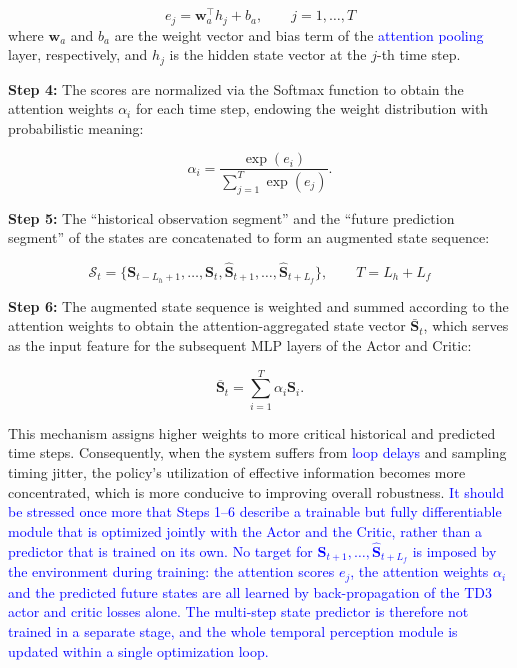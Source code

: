 \documentclass[review]{elsarticle}
\begin{document}
\begin{equation}\label{eq:attention_score}
{e}_{j}=\mathbf{w}_{a}^{\top }{h}_{j}+{b}_{a},\qquad j=1,\ldots ,T
\end{equation}
where $\mathbf{w}_a$ and $b_a$ are the weight vector and bias term of the \textcolor{blue}{attention pooling} layer, respectively, and $h_j$ is the hidden state vector at the $j$-th time step.

\textbf{Step 4:} The scores are normalized via the Softmax function to obtain the attention weights $\alpha_i$ for each time step, endowing the weight distribution with probabilistic meaning:

\begin{equation}\label{eq:softmax_attention}
\alpha_i = \frac{\exp(e_i)}{\sum_{j=1}^{T} \exp(e_j)}.
\end{equation}

\textbf{Step 5:} The ``historical observation segment'' and the ``future prediction segment'' of the states are concatenated to form an augmented state sequence:

\begin{equation}\label{eq:augmented_state_seq}
{\mathcal{S}}_{t}=\{{\mathbf{S}}_{t-{L}_{h}+1},\ldots ,{\mathbf{S}}_{t},{\hat{\mathbf{S}}}_{t+1},\ldots ,{\hat{\mathbf{S}}}_{t+{L}_{f}}\},\qquad T={L}_{h}+{L}_{f}
\end{equation}

\textbf{Step 6:} The augmented state sequence is weighted and summed according to the attention weights to obtain the attention-aggregated state vector ${\bar{\mathbf{S}}}_{t}$, which serves as the input feature for the subsequent MLP layers of the Actor and Critic:

\begin{equation}\label{eq:attention_aggregated}
{\overline{\mathbf{S}}}_{t}=\sum\limits_{i=1}^{T}{{\alpha }_{i}}{\mathbf{S}}_{i}.
\end{equation}

This mechanism assigns higher weights to more critical historical and predicted time steps.
Consequently, when the system suffers from \textcolor{blue}{loop delays} and sampling timing jitter, the policy's utilization of effective information becomes more concentrated, which is more conducive to improving overall robustness.
\textcolor{blue}{It should be stressed once more that Steps 1--6 describe a trainable but fully differentiable module that is optimized jointly with the Actor and the Critic, rather than a predictor that is trained on its own. No target for $\hat{\mathbf{S}}_{t+1},\dots,\hat{\mathbf{S}}_{t+L_f}$ is imposed by the environment during training: the attention scores $e_j$, the attention weights $\alpha_i$ and the predicted future states are all learned by back-propagation of the TD3 actor and critic losses alone. The multi-step state predictor is therefore not trained in a separate stage, and the whole temporal perception module is updated within a single optimization loop.}
\end{document}
